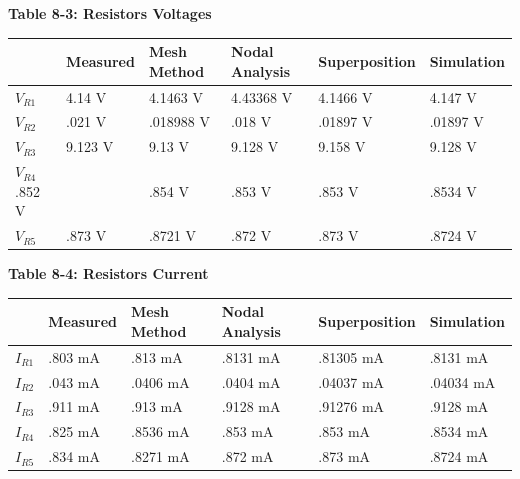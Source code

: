 \documentclass[a4paper]{article}
\begin{document}
\begin{center}
    \small\textbf{Table 8-3: Resistors Voltages}
    \begin{tabular}{|p{2 cm}|p{2cm}|p{2 cm}|p{2 cm}|p{2 cm}|p{2 cm}|}
        \hline
         & Measured & Mesh Method & Nodal Analysis & Superposition & Simulation \\
        \hline
        $V_{R1}$ & 4.14 V & 4.1463 V & 4.43368 V & 4.1466 V & 4.147 V \\
        \hline
        $V_{R2}$ & .021 V & .018988 V & .018 V & .01897 V & .01897 V \\
        \hline
        $V_{R3}$ & 9.123 V & 9.13 V & 9.128 V & 9.158 V & 9.128 V \\
        \hline
        $V_{R4}$ .852 V & & .854 V & .853 V & .853 V & .8534 V \\
        \hline
        $V_{R5}$ & .873 V & .8721 V & .872 V & .873 V & .8724 V \\
        \hline
    \end{tabular}
\end{center}

\begin{center}
    \small\textbf{Table 8-4: Resistors Current}
    \begin{tabular}{|p{2 cm}|p{2cm}|p{2 cm}|p{2 cm}|p{2 cm}|p{2 cm}|}
        \hline
         & Measured & Mesh Method & Nodal Analysis & Superposition & Simulation \\
        \hline
        $I_{R1}$ & .803 mA  & .813 mA & .8131 mA & .81305 mA &.8131 mA \\
        \hline
        $I_{R2}$ & .043 mA & .0406 mA & .0404 mA & .04037 mA  & .04034 mA\\
        \hline
        $I_{R3}$ & .911 mA & .913 mA & .9128 mA & .91276 mA & .9128 mA \\
        \hline
        $I_{R4}$ &.825 mA & .8536 mA & .853 mA &  .853 mA & .8534 mA\\
        \hline
        $I_{R5}$ & .834 mA & .8271 mA & .872 mA & .873 mA & .8724 mA\\
        \hline
    \end{tabular}
\end{center}
\end{document}
